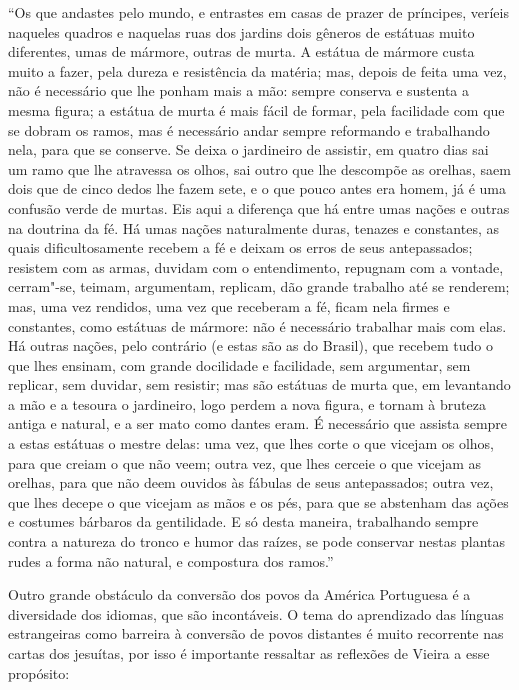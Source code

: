``Os que andastes pelo mundo, e entrastes em casas de prazer de
príncipes, veríeis naqueles quadros e naquelas ruas dos jardins dois
gêneros de estátuas muito diferentes, umas de mármore, outras de murta.
A estátua de mármore custa muito a fazer, pela dureza e resistência da
matéria; mas, depois de feita uma vez, não é necessário que lhe ponham
mais a mão: sempre conserva e sustenta a mesma figura; a estátua de
murta é mais fácil de formar, pela facilidade com que se dobram os
ramos, mas é necessário andar sempre reformando e trabalhando nela, para
que se conserve. Se deixa o jardineiro de assistir, em quatro dias sai
um ramo que lhe atravessa os olhos, sai outro que lhe descompõe as
orelhas, saem dois que de cinco dedos lhe fazem sete, e o que pouco
antes era homem, já é uma confusão verde de murtas. Eis aqui a diferença
que há entre umas nações e outras na doutrina da fé. Há umas nações
naturalmente duras, tenazes e constantes, as quais dificultosamente
recebem a fé e deixam os erros de seus antepassados; resistem com as
armas, duvidam com o entendimento, repugnam com a vontade, cerram"-se,
teimam, argumentam, replicam, dão grande trabalho até se renderem; mas,
uma vez rendidos, uma vez que receberam a fé, ficam nela firmes e
constantes, como estátuas de mármore: não é necessário trabalhar mais
com elas. Há outras nações, pelo contrário (e estas são as do Brasil),
que recebem tudo o que lhes ensinam, com grande docilidade e facilidade,
sem argumentar, sem replicar, sem duvidar, sem resistir; mas são
estátuas de murta que, em levantando a mão e a tesoura o jardineiro,
logo perdem a nova figura, e tornam à bruteza antiga e natural, e a ser
mato como dantes eram. É necessário que assista sempre a estas estátuas
o mestre delas: uma vez, que lhes corte o que vicejam os olhos, para que
creiam o que não veem; outra vez, que lhes cerceie o que vicejam as
orelhas, para que não deem ouvidos às fábulas de seus antepassados;
outra vez, que lhes decepe o que vicejam as mãos e os pés, para que se
abstenham das ações e costumes bárbaros da gentilidade. E só desta
maneira, trabalhando sempre contra a natureza do tronco e humor das
raízes, se pode conservar nestas plantas rudes a forma não natural, e
compostura dos ramos.''

Outro grande obstáculo da conversão dos povos da América Portuguesa é a
diversidade dos idiomas, que são incontáveis. O tema do aprendizado das
línguas estrangeiras como barreira à conversão de povos distantes é
muito recorrente nas cartas dos jesuítas, por isso é importante
ressaltar as reflexões de Vieira a esse propósito:


